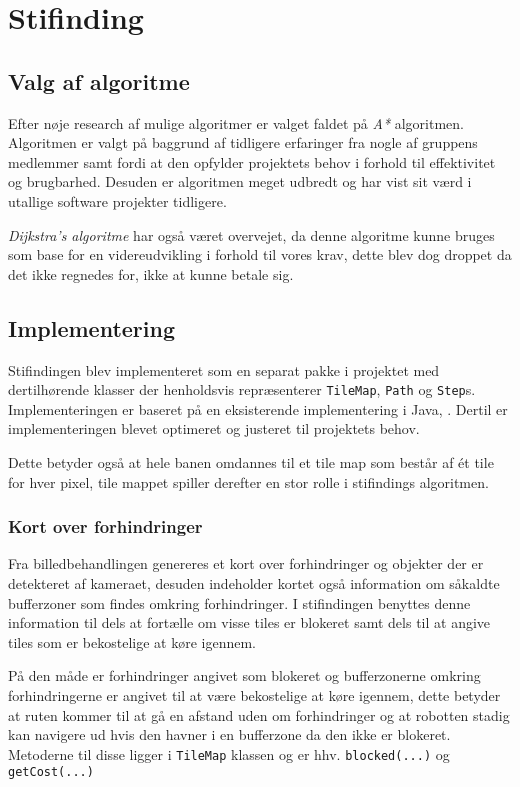 \chapter{Stifinding}

\section{Valg af algoritme}
Efter nøje research af mulige algoritmer er valget faldet på \textit{A*} algoritmen.
Algoritmen er valgt på baggrund af tidligere erfaringer fra nogle af gruppens medlemmer samt fordi at den opfylder projektets behov i forhold til effektivitet og brugbarhed. Desuden er algoritmen meget udbredt og har vist sit værd i utallige software projekter tidligere.

\textit{Dijkstra's algoritme} har også været overvejet, da denne algoritme kunne bruges som base for en videreudvikling i forhold til vores krav, dette blev dog droppet da det ikke regnedes for, ikke at kunne betale sig.

\section{Implementering}
Stifindingen blev implementeret som en separat pakke i projektet med dertilhørende klasser der henholdsvis repræsenterer \texttt{TileMap}, \texttt{Path} og \texttt{Step}s. Implementeringen er baseret på en eksisterende implementering i Java, \citet{astar}.
Dertil er implementeringen blevet optimeret og justeret til projektets behov.

Dette betyder også at hele banen omdannes til et tile map som består af ét tile for hver pixel, tile mappet spiller derefter en stor rolle i stifindings algoritmen.

\subsection{Kort over forhindringer}
Fra billedbehandlingen genereres et kort over forhindringer og objekter der er detekteret af kameraet, desuden indeholder kortet også information om såkaldte bufferzoner som findes omkring forhindringer. I stifindingen benyttes denne information til dels at fortælle om visse tiles er blokeret samt dels til at angive tiles som er bekostelige at køre igennem.

På den måde er forhindringer angivet som blokeret og bufferzonerne omkring forhindringerne er angivet til at være bekostelige at køre igennem, dette betyder at ruten kommer til at gå en afstand uden om forhindringer og at robotten stadig kan navigere ud hvis den havner i en bufferzone da den ikke er blokeret. Metoderne til disse ligger i \texttt{TileMap} klassen og er hhv. \texttt{blocked(...)} og \texttt{getCost(...)}

